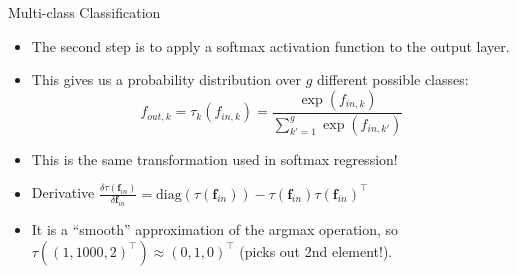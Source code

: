 \begin{frame} {Multi-class Classification}
  \begin{itemize}
    \item The second step is to apply a softmax activation function to the output layer.
    \vspace{4mm}
    \item This gives us a probability distribution over $g$ different possible classes:
    $$ f_{out,k} = \tau_k(f_{in,k}) = \frac{\exp(f_{in,k})}{\sum_{k'=1}^g\exp(f_{in,k'})}$$
    \vspace{2mm}
    \item This is the same transformation used in softmax regression!
    \vspace{4mm}
    \item Derivative $ \frac{\delta\tau(\mathbf{f}_{in})}{\delta \mathbf{f}_{in}} = \text{diag}(\tau(\mathbf{f}_{in})) - \tau(\mathbf{f}_{in}) \tau(\mathbf{f}_{in})^\top $
    \vspace{4mm}
    \item It is a \enquote{smooth} approximation of the argmax operation,
        so $\tau((1, 1000, 2)^\top) \approx (0, 1, 0)^\top$ (picks out 2nd element!).
  \end{itemize}
\end{frame}


